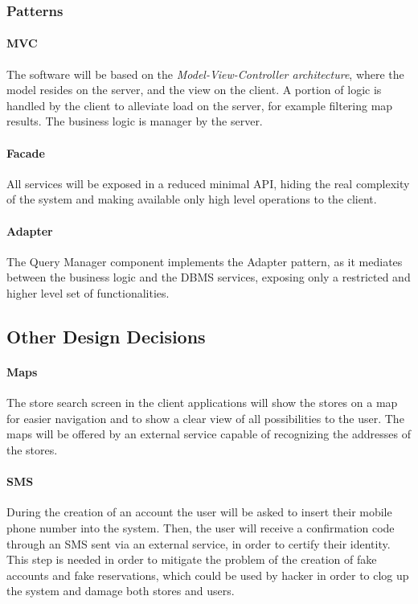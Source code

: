 \subsubsection{Patterns}

\paragraph{MVC} The software will be based on the \emph{Model-View-Controller architecture}, where the model resides on the server, and the view on the client. A portion of logic is handled by the client to alleviate load on the server, for example filtering map results. The business logic is manager by the server.

\paragraph{Facade}
All services will be exposed in a reduced minimal API, hiding the real complexity of the system and making available only high level operations to the client.

\paragraph{Adapter}
The Query Manager component implements the Adapter pattern, as it mediates between the business logic and the DBMS services, exposing only a restricted and higher level set of functionalities.

\subsection{Other Design Decisions}

\paragraph{Maps}
The store search screen in the client applications will show the stores on a map for easier navigation and to show a clear view of all possibilities to the user. The maps will be offered by an external service capable of recognizing the addresses of the stores.

\paragraph{SMS}
During the creation of an account the user will be asked to insert their mobile phone number into the system. Then, the user will receive a confirmation code through an SMS sent via an external service, in order to certify their identity. This step is needed in order to mitigate the problem of the creation of fake accounts and fake reservations, which could be used by hacker in order to clog up the system and damage both stores and users.
